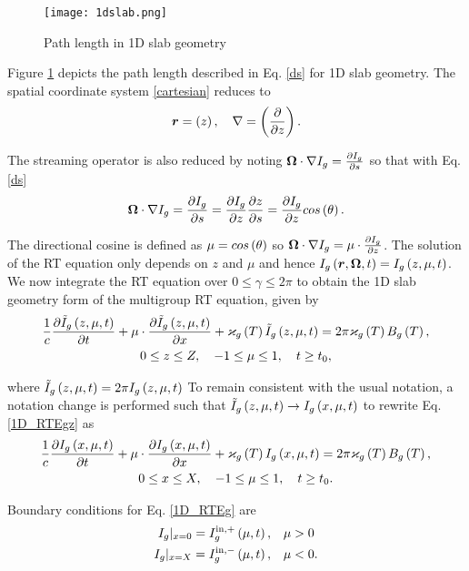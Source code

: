 	\begin{figure}[h]
		\centering
		\captionsetup{justification=centering,margin=2cm}
		\texttt{[image: 1dslab.png]} 
		\caption{\label{fig:1dslab_geom}
			Path length in 1D slab geometry}
	\end{figure}
	
	Figure \ref{fig:1dslab_geom} depicts the path length described in Eq. \eqref{ds} for 1D slab geometry. The spatial coordinate system \eqref{cartesian} reduces to
	\begin{equation}
		\bm{r} = \left( z\right), \quad \nabla = \left(\frac{\partial }{\partial z}\right). \label{1d_cartesian}
	\end{equation}
	
	The streaming operator is also reduced by noting $\bm{\Omega} \cdot \nabla I_{g} = \frac{\partial I_{g}}{\partial s}$ so that with Eq. \eqref{ds} 
	\begin{equation}
		\bm{\Omega} \cdot \nabla I_{g} = \frac{\partial I_{g}}{\partial s} = \frac{\partial I_{g}}{\partial z}\frac{\partial z}{\partial s} = \frac{\partial I_{g}}{\partial z}cos\left(\theta\right).
	\end{equation}
	
	The directional cosine is defined as $\mu = cos\left(\theta\right)$ so $\bm{\Omega} \cdot \nabla I_{g} = \mu\cdot\frac{\partial I_{g}}{\partial z}$. The solution of the RT equation only depends on $z$ and $\mu$ and hence $I_{g}\left(\bm{r},\bm{\Omega},t\right) = I_{g}\left( z,\mu,t\right)$. We now integrate the RT equation over $0\leq\gamma\leq 2\pi$ to obtain the 1D slab geometry form of the multigroup RT equation, given by
	\begin{gather}
		\frac{1}{c}\frac{\partial \tilde{I}_g\left( z,\mu,t\right)}{\partial t} + \mu\cdot\frac{\partial \tilde{I}_g\left( z,\mu,t\right)}{\partial x} + \varkappa_{g}\left( T\right)\tilde{I}_g\left( z,\mu,t\right) = 2\pi\varkappa_{g}\left( T\right)B_{g}\left( T\right), \label{1D_RTEgz}\\
		0\leq z\leq Z, \quad -1\leq\mu\leq 1, \quad t\geq t_0, \nonumber
	\end{gather}
	
	where $\tilde{I}_g\left( z,\mu,t\right) = 2\pi I_g\left( z,\mu,t\right)$ To remain consistent with the usual notation, a notation change is performed such that $\tilde{I}_g\left( z,\mu,t\right) \rightarrow I_g\left( x,\mu,t\right)$ to rewrite Eq. \eqref{1D_RTEgz} as
	\begin{gather}
		\frac{1}{c}\frac{\partial I_{g}\left( x,\mu,t\right)}{\partial t} + \mu\cdot\frac{\partial I_{g}\left( x,\mu,t\right)}{\partial x} + \varkappa_{g}\left( T\right)I_{g}\left( x,\mu,t\right) = 2\pi\varkappa_{g}\left( T\right)B_{g}\left( T\right), \label{1D_RTEg}\\
		0\leq x\leq X, \quad -1\leq\mu\leq 1, \quad t\geq t_0 \nonumber.
	\end{gather}
	
	Boundary conditions for Eq. \eqref{1D_RTEg} are
	\begin{subequations}
		\begin{align}
			I_{g}|_{x=0} = I_{g}^{\text{in},+}\left(\mu,t\right), \quad &\mu>0 \\
			I_{g}|_{x=X} = I_{g}^{\text{in},-}\left(\mu,t\right), \quad &\mu<0.
		\end{align}
	\end{subequations}
	
